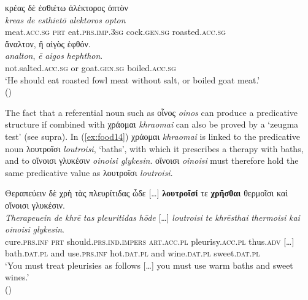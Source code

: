 \documentclass[output=paper,colorlinks,citecolor=brown]{langscibook}
\begin{document}
\begin{exe}
\ex\label{ex:food13}
\glll κρέας δὲ ἐσθιέτω ἀλέκτορος ὀπτὸν  \\ 
\textit{kreas} \textit{de} \textit{esthietō} \textit{alektoros} \textit{opton} \\
meat.\textsc{acc.sg} \textsc{prt} eat.\textsc{prs.imp.3sg} cock.\textsc{gen.sg} roasted.\textsc{acc.sg}  \\

\glll ἄναλτον, ἢ αἰγὸς ἑφθόν. \\
\textit{analton}, \textit{ē} \textit{aigos} \textit{hephthon}. \\
not.salted.\textsc{acc.sg} or goat.\textsc{gen.sg} boiled.\textsc{acc.sg} \\
\glt ‘He should eat roasted fowl meat without salt, or boiled goat meat.' \\
\hspace*{\fill}()
\end{exe}

The fact that a referential noun such as οἶνος \textit{oinos} can produce a predicative structure if combined with χράομαι \textit{khraomai} can also be proved by a ‘zeugma test’ (see supra). In (\ref{ex:food14}) χράομαι \textit{khraomai} is linked to the predicative noun λουτροῖσι \textit{loutroisi}, ‘baths’, with which it prescribes a therapy with baths, and to οἴνοισι γλυκέσιν \textit{oinoisi glykesin}. οἴνοισι \textit{oinoisi} must therefore hold the same predicative value as λουτροῖσι \textit{loutroisi}. 

\begin{exe}
\ex\label{ex:food14}
\glll Θεραπεύειν δὲ χρὴ τὰς πλευρίτιδας ὧδε […] \textbf{λουτροῖσί} τε \textbf{χρῆσθαι} θερμοῖσι καὶ οἴνοισι γλυκέσιν.\\ 
\textit{Therapeuein} \textit{de} \textit{khrē} \textit{tas} \textit{pleuritidas} \textit{hōde} […] \textit{loutroisi} \textit{te} \textit{khrēsthai} \textit{thermoisi} \textit{kai} \textit{oinoisi} \textit{glykesin}.\\
cure.\textsc{prs.inf} \textsc{prt} should.\textsc{prs.ind.impers} \textsc{art.acc.pl} pleurisy.\textsc{acc.pl} thus.\textsc{adv} […] bath.\textsc{dat.pl} and use.\textsc{prs.inf} hot.\textsc{dat.pl} and wine.\textsc{dat.pl} sweet.\textsc{dat.pl} \\
\glt ‘You must treat pleurisies as follows […] you must use warm baths and sweet wines.' \\
\hspace*{\fill}()
\end{exe}
\end{document}
